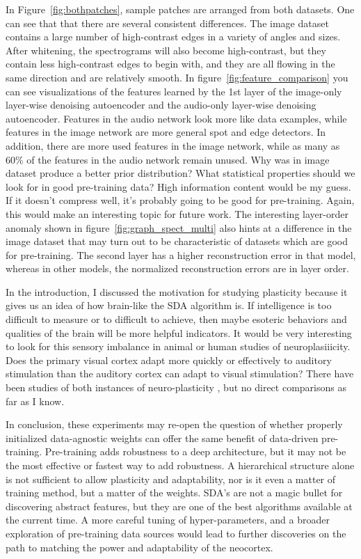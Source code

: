 \documentclass[12pt]{article}
\begin{document}
\begin{doublespacing}
	In Figure~\ref{fig:bothpatches}, sample patches are arranged from both datasets. One can see that that there are several consistent differences. The image dataset contains a large number of high-contrast edges in a variety of angles and sizes. After whitening, the spectrograms will also become high-contrast, but they contain less high-contrast edges to begin with, and they are all flowing in the same direction and are relatively smooth. In figure~\ref{fig:feature_comparison} you can see visualizations of the features learned by the 1st layer of the image-only layer-wise denoising autoencoder and the audio-only layer-wise denoising autoencoder. Features in the audio network look more like data examples, while features in the image network are more general spot and edge detectors. In addition, there are more used features in the image network, while as many as 60\% of the features in the audio network remain unused. Why was in image dataset produce a better prior distribution? What statistical properties should we look for in good pre-training data? High information content would be my guess. If it doesn't compress well, it's probably going to be good for pre-training. Again, this would make an interesting topic for future work. The interesting layer-order anomaly shown in figure~\ref{fig:graph_spect_multi} also hints at a difference in the image dataset that may turn out to be characteristic of datasets which are good for pre-training. The second layer has a higher reconstruction error in that model, whereas in other models, the normalized reconstruction errors are in layer order.
	
	In the introduction, I discussed the motivation for studying plasticity because it gives us an idea of how brain-like the SDA algorithm is. If intelligence is too difficult to measure or to difficult to achieve, then maybe esoteric behaviors and qualities of the brain will be more helpful indicators. It would be very interesting to look for this sensory imbalance in animal or human studies of neuroplasiiicity. Does the primary visual cortex adapt more quickly or effectively to auditory stimulation than the auditory cortex can adapt to visual stimulation? There have been studies of both instances of neuro-plasticity \cite{ryugo1975increased, gyllensten1966growth}, but no direct comparisons as far as I know. 
	
	In conclusion, these experiments may re-open the question of whether properly initialized data-agnostic weights can offer the same benefit of data-driven pre-training. Pre-training adds robustness to a deep architecture, but it may not be the most effective or fastest way to add robustness. A hierarchical structure alone is not sufficient to allow plasticity and adaptability, nor is it even a matter of training method, but a matter of the weights. SDA's are not a magic bullet for discovering abstract features, but they are one of the best algorithms available at the current time. A more careful tuning of hyper-parameters, and a broader exploration of pre-training data sources would lead to further discoveries on the path to matching the power and adaptability of the neocortex.

\end{doublespacing}

\singlespacing




\end{document}
